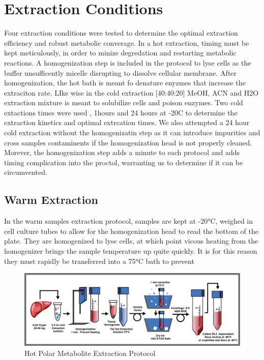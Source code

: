 \documentclass[a4paper]{article}
\begin{document}
\section{Extraction Conditions}

Four extraction conditions were tested to determine the optimal extraction efficiency and robust metabolic converage. 
In a hot extraction, timing must be kept meticulously, in order to minize degredation and restarting metabolic reactions.
A homogenization step is included in the protocol to lyse cells as the buffer unsufficently micelle disrupting to dissolve cellular membrane. 
After homogenization, the hot bath is meant fo denature enyzmes that increase the extraciton rate.
LIke wise in the cold extraction [40:40:20] MeOH, ACN and H2O extraction mixture is meant to solubilize cells and poison enzymes.
Two cold extactions times were used , 1hours and 24 hours at -20C to determine the extraction kinetics and optimal extrcation times.
We also attempted a 24 hour cold extraction without the homogenizatin step as it can introduce impurities and cross samples contaminents if the homogenization head is not properly cleaned. 
Morever, the homogenization step adds a minute to each protocol and adds timing complication into the proctol, 
warranting us to determine if it can be circumvented.

\subsection{Warm Extraction}
In the warm samples extraction protocol, samples are kept at -20°C, weighed in cell culture tubes to allow for the homogenization head to read the bottom of the plate.
They are homogenized to lyse cells, at which point vicous heating from the homogenizer brings the sample temperature up quite quickly. It is for this reason they must rapidly be transferred into
a 75°C bath to prevent

\begin{figure}[h]
	\centering
	\includegraphics[width=1\linewidth]{Metab-Proto-MH-20170120-3}
	\caption{Hot Polar Metabolite Extraction Protocol}
	\label{fig:metab-proto-mh-20170105}
\end{figure}
\end{document}

